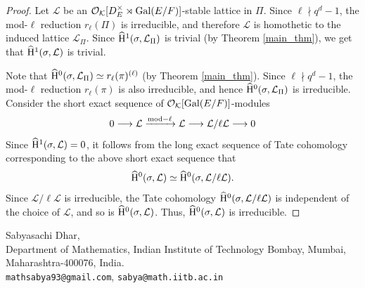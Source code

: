\documentclass[10pt, reqno]{amsart}
\theoremstyle{plain}
\numberwithin{equation}{section}
\begin{document}
\begin{proof}
Let $\mathcal{L}$ be an $\mathcal{O}_{\mathcal{K}}[D_E^\times\rtimes{\rm Gal}(E/F)]$-stable lattice in $\Pi$. Since $\ell\nmid q^d-1$, the mod-$\ell$ reduction $r_\ell(\Pi)$ is irreducible, and therefore $\mathcal{L}$ is homothetic to the induced lattice $\mathcal{L}_{\Pi}$. Since $\widehat{\rm H}^1(\sigma,\mathcal{L}_{\Pi})$ is trivial (by Theorem \ref{main_thm}), we get that $\widehat{\rm H}^1(\sigma,\mathcal{L})$ is trivial.

Note that $\widehat{\rm H}^0(\sigma,\mathcal{L}_{\Pi})\simeq r_\ell(\pi)^{(\ell)}$ (by Theorem \ref{main_thm}). Since $\ell\nmid q^d-1$, the mod-$\ell$ reduction $r_\ell(\pi)$ is also irreducible, and hence $\widehat{\rm H}^0(\sigma,\mathcal{L}_\Pi)$ is irreducible. Consider the short exact sequence of $\mathcal{O}_{\mathcal{K}}[{\rm Gal}(E/F)]$-modules
$$ 0\longrightarrow\mathcal{L}\xrightarrow{{\rm mod}-\ell}\mathcal{L}\longrightarrow\mathcal{L}/\ell\mathcal{L}\longrightarrow 0$$
Since $\widehat{\rm H}^1(\sigma,\mathcal{L}) =0$, it follows from the long exact sequence of Tate cohomology corresponding to the above short exact sequence that
$$ \widehat{\rm H}^0(\sigma,\mathcal{L})\simeq \widehat{\rm H}^0(\sigma,\mathcal{L}/\ell\mathcal{L}).$$
Since $\mathcal{L}/\ell\mathcal{L}$ is irreducible, the Tate cohomology $\widehat{\rm H}^0(\sigma,\mathcal{L}/\ell\mathcal{L})$ is independent of the choice of $\mathcal{L}$, and so is $\widehat{\rm H}^0(\sigma,\mathcal{L})$. Thus, $\widehat{\rm H}^0(\sigma,\mathcal{L})$ is irreducible.
\end{proof}






\vspace{0.2 cm}
Sabyasachi Dhar,\\
Department of Mathematics, Indian Institute of Technology Bombay, Mumbai, Maharashtra-400076, India.\\
\texttt{mathsabya93@gmail.com},
\texttt{sabya@math.iitb.ac.in}
\end{document}
